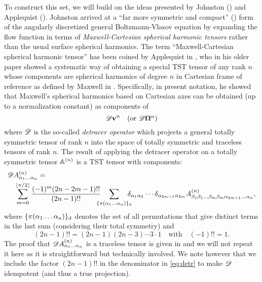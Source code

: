 To construct this set, we will build on the ideas presented by Johnston (\cite{Johnston1}) and Applequist
(\cite{Applequist1}). Johnston arrived at a ``far more symmetric and compact'' (\cite[p. 1455]{Johnston1}) form of the
angularly discretized general Boltzmann-Vlasov equation by expanding the flow function in terms of
\textit{Maxwell-Cartesian spherical harmonic tensors} rather than the usual surface spherical harmonics. The term
``Maxwell-Cartesian spherical harmonic tensor'' has been coined by Applequist in \cite{Applequist2}, who in his older
paper \cite{Applequist1} showed a systematic way of obtaining a special TST tensor of any rank $n$ whose components are
spherical harmonics of degree $n$ in Cartesian frame of reference as defined by Maxwell in \cite[p. 160]{Maxwell}.
Specifically, in present notation, he showed that Maxwell's spherical harmonics based on Cartesian axes can be obtained
(up to a normalization constant) as components of $$
  \detr \bv^n \quad \mbox{(or $\detr \bomega^n$)}
$$ where $\detr$ is the so-called \textit{detracer operator} which projects a general totally symmetric tensor of rank
$n$ into the space of totally symmetric and traceless tensors of rank $n$. The result of
applying the detracer operator on a totally symmetric tensor $\AA$ is a TST tensor with components:
\begin{equation}\label{eq:detr}
\begin{multlined}
  \detr \AAA{\alpha_1\ldots\alpha_n} = \\ \suma[m]{0}{\lfloor n/2 \rfloor} \frac{(-1)^m(2n-2m-1)!!
  }{(2n-1)!!}\quad\sum_{\mathclap{\{\perm{\alpha_1\ldots\alpha_n}\}_{\text{d}}}}\quad\kron{\alpha_1}{\alpha_2}\cdots\kron{\alpha_{2m-1}}{\alpha_{2m}}\AAA{\beta_1\beta_1\ldots\beta_m\beta_m\alpha_{2m+1}\ldots\alpha_n},
\end{multlined}
\end{equation}
where $\{\perm{\alpha_1\ldots\alpha_n}\}_{\text{d}}$ denotes the set of all permutations that give distinct terms in 
the last sum (considering their total symmetry) and $$(2n-1)!! = (2n-1)(2n-3)\cdots 3\cdot 1 \quad \mbox{with}\quad
(-1)!! = 1.$$
The proof that $\detr \AAA{\alpha_1\ldots\alpha_n}$ is a traceless tensor is given in \cite[Sec.
5]{Applequist1} and we will not repeat it here as it is straightforward but technically involved. We note however that
we include the factor $(2n-1)!!$ in the denominator in \eqref{eq:detr} to make $\detr$ idempotent (and thus a true
projection).

